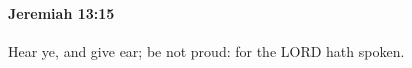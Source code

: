 
		\paragraph{Jeremiah 13:15} %
			\label{JEREMIAH-13-15}

			Hear ye, and give ear; be not proud: for the LORD hath spoken.


